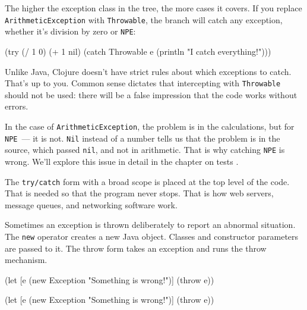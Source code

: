 
The higher the exception class in the tree, the more cases it covers. If you replace \verb|ArithmeticException| with \verb|Throwable|, the branch will catch any exception, whether it's division by zero or \verb|NPE|:

\begin{english}
  \begin{clojure}
(try
  (/ 1 0)
  (+ 1 nil)
  (catch Throwable e
    (println "I catch everything!")))
  \end{clojure}
\end{english}

Unlike Java, Clojure doesn't have strict rules about which exceptions to catch. That's up to you. Common sense dictates that intercepting with \verb|Throwable| should not be used: there will be a false impression that the code works without errors.

In the case of \verb|ArithmeticException|, the problem is in the calculations, but for \verb|NPE|~--- it is not. \verb|Nil| instead of a number tells us that the problem is in the source, which passed \verb|nil|, and not in arithmetic. That is why catching \verb|NPE| is wrong. We'll explore this issue in detail in the chapter on tests .

The \verb|try/catch| form with a broad scope is placed at the top level of the code. That is needed so that the program never stops. That is how web servers, message queues, and networking software work.


Sometimes an exception is thrown deliberately to report an abnormal situation. The \verb|new| operator creates a new Java object. Classes and constructor parameters are passed to it. The throw form takes an exception and runs the throw mechanism.

\ifx\DEVICETYPE\MOBILE

\begin{english}
  \begin{clojure}
(let [e (new Exception
          "Something is wrong!")]
  (throw e))
  \end{clojure}
\end{english}

\else

\begin{english}
  \begin{clojure}
(let [e (new Exception "Something is wrong!")]
  (throw e))
  \end{clojure}
\end{english}

